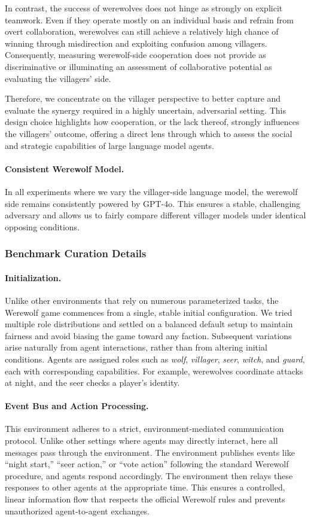 In contrast, the success of werewolves does not hinge as strongly on explicit teamwork. Even if they operate mostly on an individual basis and refrain from overt collaboration, werewolves can still achieve a relatively high chance of winning through misdirection and exploiting confusion among villagers. Consequently, measuring werewolf-side cooperation does not provide as discriminative or illuminating an assessment of collaborative potential as evaluating the villagers’ side.

Therefore, we concentrate on the villager perspective to better capture and evaluate the synergy required in a highly uncertain, adversarial setting. This design choice highlights how cooperation, or the lack thereof, strongly influences the villagers’ outcome, offering a direct lens through which to assess the social and strategic capabilities of large language model agents.

\paragraph{Consistent Werewolf Model.}
In all experiments where we vary the villager-side language model, the werewolf side
remains consistently powered by GPT-4o. This ensures a stable, challenging adversary
and allows us to fairly compare different villager models under identical opposing conditions.
\subsubsection{Benchmark Curation Details}

\paragraph{Initialization.}
Unlike other environments that rely on numerous parameterized tasks, the Werewolf game commences from a single, stable initial configuration. We tried multiple role distributions and settled on a balanced default setup to maintain fairness and avoid biasing the game toward any faction. Subsequent variations arise naturally from agent interactions, rather than from altering initial conditions. Agents are assigned roles such as \emph{wolf}, \emph{villager}, \emph{seer}, \emph{witch}, and \emph{guard}, each with corresponding capabilities. For example, werewolves coordinate attacks at night, and the seer checks a player’s identity.

\paragraph{Event Bus and Action Processing.}
This environment adheres to a strict, environment-mediated communication protocol. Unlike other settings where agents may directly interact, here all messages pass through the environment. The environment publishes events like “night start,” “seer action,” or “vote action” following the standard Werewolf procedure, and agents respond accordingly. The environment then relays these responses to other agents at the appropriate time. This ensures a controlled, linear information flow that respects the official Werewolf rules and prevents unauthorized agent-to-agent exchanges.

